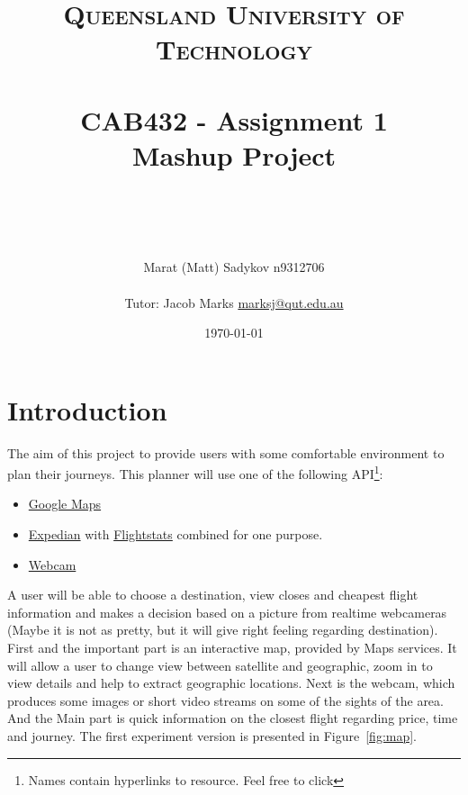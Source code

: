 \documentclass[12pt]{article}
\title{	
	\normalfont \normalsize 
	\textsc{Queensland University of Technology} \\ [25pt] 
	\horrule{0.5pt} \\[0.4cm] %
	\huge CAB432 - Assignment 1 \\ Mashup Project \\ %
	\author{ Marat (Matt) Sadykov \small n9312706 \\ \\ Tutor: Jacob Marks \small \underline{marksj@qut.edu.au}}
	\date{\normalsize\today} %
	\horrule{2pt} \\[0.5cm] %
}
\numberwithin{equation}{section} %
\numberwithin{figure}{section} %
\numberwithin{table}{section} %
\begin{document}
\maketitle
\newpage
\tableofcontents
\newpage
\section{Introduction}	

	The aim of this project to provide users with some comfortable environment to plan their journeys. This planner will use one of the following API\footnote{Names contain hyperlinks to resource. Feel free to click}: 
	
	\begin{itemize}
		\item \href{https://developers.google.com/maps/documentation/}{Google Maps}
		\item \href{https://hackathon.expedia.com/docs/public/api/Flights Overview/}{Expedian} with \href{https://api.flightstats.com/flex/flightstatus/rest/v2/json/route/status/}{Flightstats} combined for one purpose.
		\item \href{https://developers.webcams.travel/\#webcams/list}{Webcam}
	\end{itemize}	
	A user will be able to choose a destination, view closes and cheapest flight information and makes a decision based on a picture from realtime webcameras (Maybe it is not as pretty, but it will give right feeling regarding destination). First and the important part is an interactive map, provided by Maps services. It will allow a user to change view between satellite and geographic, zoom in to view details and help to extract geographic locations. Next is the webcam, which produces some images or short video streams on some of the sights of the area. And the Main part is quick information on the closest flight regarding price, time and journey. The first experiment version is presented in Figure~\ref{fig:map}.	
\end{document}
